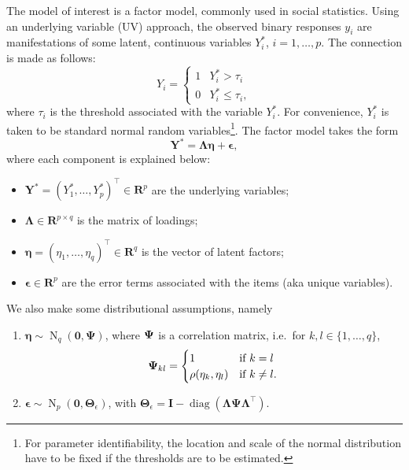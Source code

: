 \documentclass[
]{article}
\begin{document}
The model of interest is a factor model, commonly used in social
statistics. Using an underlying variable (UV) approach, the observed
binary responses \(y_i\) are manifestations of some latent, continuous
variables \(Y_i^*\), \(i=1,\dots,p\). The connection is made as follows:
\[
Y_i = \begin{cases}
1 & Y_i^* > \tau_i \\
0 & Y_i^* \leq \tau_i,
\end{cases}
\] where \(\tau_i\) is the threshold associated with the variable
\(Y_i^*\). For convenience, \(Y_i^*\) is taken to be standard normal
random variables\footnote{For parameter identifiability, the location
  and scale of the normal distribution have to be fixed if the
  thresholds are to be estimated.}. The factor model takes the form \[
\mathbf Y^* = \mathbf \Lambda\boldsymbol \eta + \boldsymbol \epsilon,
\] where each component is explained below:

\begin{itemize}
\item
  \(\mathbf Y^* = (Y_1^*,\dots,Y_p^*)^\top \in \mathbf R^p\) are the
  underlying variables;
\item
  \(\boldsymbol\Lambda \in \mathbf R^{p \times q}\) is the matrix of
  loadings;
\item
  \(\boldsymbol \eta = (\eta_1,\dots,\eta_q)^\top \in \mathbf R^q\) is
  the vector of latent factors;
\item
  \(\boldsymbol \epsilon \in \mathbf R^p\) are the error terms
  associated with the items (aka unique variables).
\end{itemize}

We also make some distributional assumptions, namely

\begin{enumerate}
\def\labelenumi{\arabic{enumi}.}
\item
  \(\boldsymbol\eta \sim \operatorname{N}_q(\mathbf 0, \boldsymbol\Psi)\),
  where \({\boldsymbol\Psi}\) is a correlation matrix, i.e.~for
  \(k,l\in\{1,\dots,q\}\), \[
  {\boldsymbol\Psi}_{kl} = \begin{cases}
  1 & \text{if }  k = l \\
  \rho(\eta_k, \eta_l) & \text{if } k \neq l.
  \end{cases}
  \]
\item
  \(\boldsymbol \epsilon \sim \operatorname{N}_p(\mathbf 0, \boldsymbol\Theta_\epsilon)\),
  with
  \(\boldsymbol\Theta_\epsilon = \mathbf I - \operatorname{diag}(\boldsymbol\Lambda \boldsymbol\Psi \boldsymbol\Lambda^\top)\).
\end{enumerate}
\end{document}
